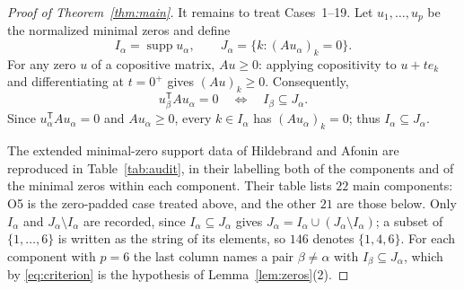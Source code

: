 \documentclass[11pt]{amsart}
\theoremstyle{remark}
\newcommand{\supp}{\operatorname{supp}}
\begin{document}
\begin{proof}[Proof of Theorem~\ref{thm:main}]
It remains to treat Cases~1--19. Let $u_1,\dots,u_p$ be the normalized
minimal zeros and define
\[
I_\alpha=\supp u_\alpha,
\qquad
J_\alpha=\{k:(Au_\alpha)_k=0\}.
\]
For any zero $u$ of a copositive matrix, $Au\ge0$: applying copositivity to
$u+t e_k$ and differentiating at $t=0^+$ gives $(Au)_k\ge0$. Consequently,
\begin{equation}\label{eq:criterion}
u_\beta^{\mathsf T}Au_\alpha=0
\quad\Longleftrightarrow\quad
I_\beta\subseteq J_\alpha.
\end{equation}
Since $u_\alpha^{\mathsf T}Au_\alpha=0$ and $Au_\alpha\ge0$, every $k\in
I_\alpha$ has $(Au_\alpha)_k=0$; thus $I_\alpha\subseteq J_\alpha$.

The extended minimal-zero support data of Hildebrand and Afonin
\cite[Table~1]{HA} are reproduced in Table~\ref{tab:audit}, in their
labelling both of the components and of the minimal zeros within each
component. Their table lists $22$ main components: O5 is the zero-padded
case treated above, and the other $21$ are those below. Only $I_\alpha$ and
$J_\alpha\setminus I_\alpha$ are recorded, since $I_\alpha\subseteq J_\alpha$
gives $J_\alpha=I_\alpha\cup(J_\alpha\setminus I_\alpha)$; a subset of
$\{1,\dots,6\}$ is written as the string of its elements, so $146$ denotes
$\{1,4,6\}$. For each component with $p=6$ the last column names a pair
$\beta\ne\alpha$ with $I_\beta\subseteq J_\alpha$, which by
\eqref{eq:criterion} is the hypothesis of Lemma~\ref{lem:zeros}(2).


\end{proof}
\end{document}
